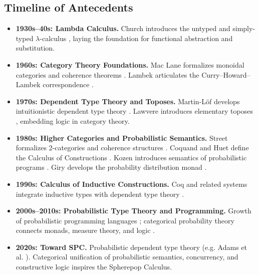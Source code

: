 \documentclass{article}
\begin{document}
\subsection{Timeline of Antecedents}
\begin{itemize}
  \item \textbf{1930s--40s: Lambda Calculus.}
    Church introduces the untyped and simply-typed $\lambda$-calculus 
    \cite{church1940formulation}, laying the foundation for functional 
    abstraction and substitution.

  \item \textbf{1960s: Category Theory Foundations.}
    Mac Lane formalizes monoidal categories and coherence theorems \cite{maclane1963natural}.
    Lambek articulates the Curry--Howard--Lambek correspondence \cite{lambek1986categorical}.

  \item \textbf{1970s: Dependent Type Theory and Toposes.}
    Martin-Löf develops intuitionistic dependent type theory \cite{martinlof1975intuitionistic}.
    Lawvere introduces elementary toposes \cite{lawvere1970quantifiers}, embedding logic in category theory.

  \item \textbf{1980s: Higher Categories and Probabilistic Semantics.}
    Street formalizes 2-categories and coherence structures \cite{street1972two}.
    Coquand and Huet define the Calculus of Constructions \cite{coquand1988calculus}.
    Kozen introduces semantics of probabilistic programs \cite{kozen1981semantics}.
    Giry develops the probability distribution monad \cite{giry1982categorical}.

  \item \textbf{1990s: Calculus of Inductive Constructions.}
    Coq and related systems integrate inductive types with dependent type theory 
    \cite{bertot2004interactive}.

  \item \textbf{2000s--2010s: Probabilistic Type Theory and Programming.}
    Growth of probabilistic programming languages 
    \cite{goodman2014design,gordon2014probabilistic,van2018introduction}; 
    categorical probability theory connects monads, measure theory, and logic 
    \cite{jacobs2015new,fritz2020synthetic}.

  \item \textbf{2020s: Toward SPC.}
    Probabilistic dependent type theory (e.g. Adams et al. \cite{adams2020foundations}).
    Categorical unification of probabilistic semantics, concurrency, 
    and constructive logic inspires the Spherepop Calculus.
\end{itemize}
\end{document}
